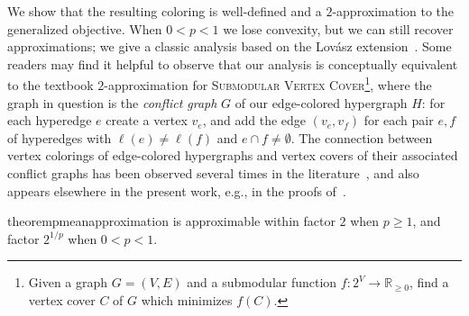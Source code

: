 We show that the resulting coloring is well-defined and a $2$-approximation to the generalized objective.
When $0 < p < 1$ we lose convexity, but we can still recover approximations; we give a classic analysis based on the Lov{\'a}sz extension~\cite{lovasz1983submodular}.
Some readers may find it helpful to observe that our analysis is conceptually equivalent to the textbook $2$-approximation for \textsc{Submodular Vertex Cover}\footnote{Given a graph $G = (V, E)$ and a submodular function $f\colon 2^V \rightarrow \mathbb{R}_{\geq 0}$, find a vertex cover $C$ of $G$ which minimizes $f(C)$.}, where the graph in question is the \emph{conflict graph} $G$ of our edge-colored hypergraph $H$: for each hyperedge $e$ create a vertex $v_e$, and add the edge $(v_e,v_f)$ for each pair $e, f$ of hyperedges with $\ell(e) \neq \ell(f)$ and $e \cap f \neq \emptyset$.
The connection between vertex colorings of edge-colored hypergraphs and vertex covers of their associated conflict graphs has been observed several times in the literature~\cite{angel2016clustering,cai2018alternating,kellerhals2023parameterized,veldt2023optimal}, and also appears elsewhere in the present work, e.g., in the proofs of~.
\begin{restatable}{theorem}{pmeanapproximation}\label{thm:pmean-approximation}
    \pmeanECC{} is approximable within factor $2$ when $p \geq 1$, and factor $2^{1/p}$ when $0 < p < 1$.
\end{restatable}
